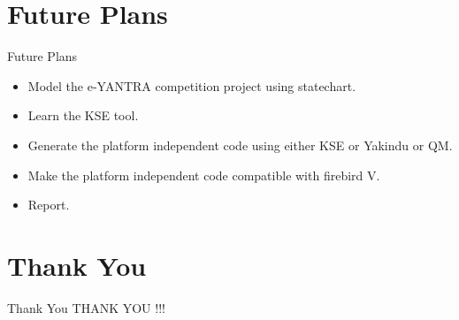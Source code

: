 \documentclass[10pt, a4paper]{beamer}
\begin{document}
\section{Future Plans}
\begin{frame}{Future Plans}
    \begin{itemize}
    \item Model the e-YANTRA competition project using statechart.
        \item  Learn the KSE tool.
         \item    Generate the platform independent code using either KSE or Yakindu or QM.
         \item    Make the platform independent code compatible with firebird V.
          \item   Report.

    \end{itemize}
\end{frame}


\section{Thank You}
\begin{frame}{Thank You}
    \centering THANK YOU !!!
\end{frame}
\end{document}
